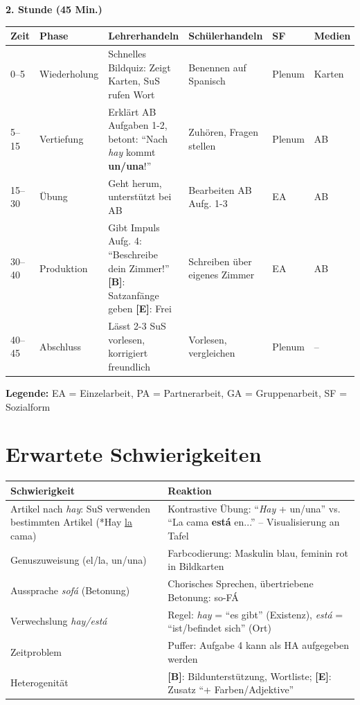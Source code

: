 \documentclass[11pt,a4paper]{article}
\newcommand{\B}{\textcolor{basis}{\textbf{[B]}}}
\newcommand{\E}{\textcolor{erweiterung}{\textbf{[E]}}}
\begin{document}
\vspace{1em}

\textbf{2. Stunde (45 Min.)}

\begin{longtable}{|p{1cm}|p{1.5cm}|p{4cm}|p{3cm}|p{2cm}|p{2cm}|}
\hline
\textbf{Zeit} & \textbf{Phase} & \textbf{Lehrerhandeln} & \textbf{Schülerhandeln} & \textbf{SF} & \textbf{Medien} \\
\hline
\endhead

0--5 & Wieder\-holung & Schnelles Bildquiz: Zeigt Karten, SuS rufen Wort & Benennen auf Spanisch & Plenum & Karten \\
\hline

5--15 & Vertiefung & Erklärt AB Aufgaben 1-2, betont: ``Nach \textit{hay} kommt \textbf{un/una}!'' & Zuhören, Fragen stellen & Plenum & AB \\
\hline

15--30 & Übung & Geht herum, unterstützt bei AB & Bearbeiten AB Aufg. 1-3 & EA & AB \\
\hline

30--40 & Produktion & Gibt Impuls Aufg. 4: ``Beschreibe dein Zimmer!'' \B{}: Satzanfänge geben \E{}: Frei & Schreiben über eigenes Zimmer & EA & AB \\
\hline

40--45 & Abschluss & Lässt 2-3 SuS vorlesen, korrigiert freundlich & Vorlesen, vergleichen & Plenum & -- \\
\hline
\end{longtable}

\textbf{Legende:} EA = Einzelarbeit, PA = Partnerarbeit, GA = Gruppenarbeit, SF = Sozialform

\section{Erwartete Schwierigkeiten}

\begin{tabular}{|p{5cm}|p{8cm}|}
\hline
\textbf{Schwierigkeit} & \textbf{Reaktion} \\
\hline
Artikel nach \textit{hay}: SuS verwenden bestimmten Artikel (*Hay \underline{la} cama) & Kontrastive Übung: ``\textit{Hay} + un/una'' vs. ``La cama \textbf{está} en...'' -- Visualisierung an Tafel \\
\hline
Genuszuweisung (el/la, un/una) & Farbcodierung: Maskulin blau, feminin rot in Bildkarten \\
\hline
Aussprache \textit{sofá} (Betonung) & Chorisches Sprechen, übertriebene Betonung: so-FÁ \\
\hline
Verwechslung \textit{hay/está} & Regel: \textit{hay} = ``es gibt'' (Existenz), \textit{está} = ``ist/befindet sich'' (Ort) \\
\hline
Zeitproblem & Puffer: Aufgabe 4 kann als HA aufgegeben werden \\
\hline
Heterogenität & \B{}: Bildunterstützung, Wortliste; \E{}: Zusatz ``+ Farben/Adjektive'' \\
\hline
\end{tabular}
\end{document}
